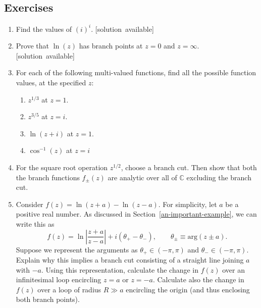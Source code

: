 \documentclass[10pt,a4paper]{article}
\begin{document}
\vskip 0.5in

\subsection{Exercises}\label{exercises}

\begin{enumerate}
\item
Find the values of $(i)^i$.
  \hfill{\scriptsize [solution~available]}

\item
Prove that $\ln(z)$ has branch points at $z = 0$ and $z = \infty$.
  \hfill{\scriptsize [solution~available]}

\item For each of the following multi-valued functions, find all the possible
function values, at the specified $z$:
\begin{enumerate}
\item $z^{1/3}$ at $z = 1$.

\item $z^{3/5}$ at $z = i$.

\item $\ln(z+i)$ at $z = 1$.

\item $\cos^{-1}(z)$ at $z = i$
\end{enumerate}

\item
For the square root operation $z^{1/2}$, choose a branch cut. Then
show that both the branch functions $f_\pm(z)$ are analytic over all
of $\mathbb{C}$ excluding the branch cut.

\item
  Consider $f(z) = \ln(z+a) - \ln(z-a)$. For simplicity, let $a$ be a
  positive real number. As discussed in
  Section~\ref{an-important-example}, we can write this as
\begin{equation}
f(z) = \ln\left|\frac{z+a}{z-a}\right| + i(\theta_+ - \theta_-), \qquad \theta_\pm \equiv \mathrm{arg}(z\pm a).
\end{equation}
Suppose we represent the arguments as $\theta_+ \in (-\pi,\pi)$ and
$\theta_- \in (-\pi,\pi)$. Explain why this implies a branch cut
consisting of a straight line joining $a$ with $-a$. Using this
representation, calculate the change in $f(z)$ over an infinitesimal
loop encircling $z = a$ or $z = -a$. Calculate also the change in
$f(z)$ over a loop of radius $R \gg a$ encircling the origin (and
thus enclosing both branch points).
\end{enumerate}
\end{document}
